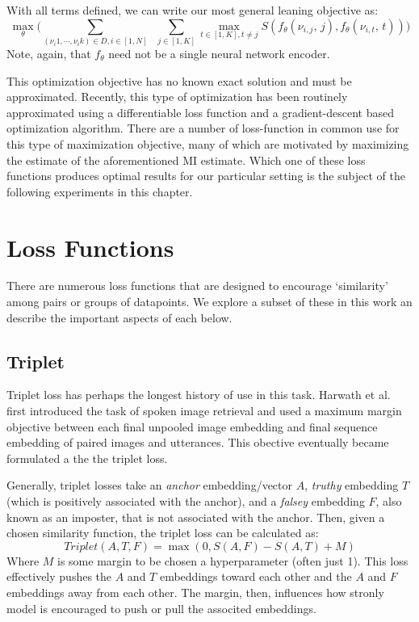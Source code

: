 With all terms defined, we can write our most general leaning objective as:
\begin{equation}
    \underset{\theta}{\max} \Big(\sum_{(\nu_i1,\cdots, \nu_ik)\in D, i\in[1,N]} \;\; \sum_{j\in[1,K]} \underset{t\in[1,K], t\neq j }{\max} S(f_\theta(\nu_{i,j}, \,j), f_\theta(\nu_{i,t}, \,t))\Big)
\end{equation}
Note, again, that $f_\theta$ need not be a single neural network encoder.

This optimization objective has no known exact solution  and must be approximated.
Recently, this type of optimization has been routinely  approximated using a differentiable loss function and a gradient-descent based optimization algorithm.
There are a number of loss-function in common use for this type of maximization objective, many of which are motivated by maximizing the estimate of the aforementioned MI estimate.
Which one of these loss functions produces optimal results for our particular setting is the subject of the following experiments in this chapter.

\section{Loss Functions}
There are numerous loss functions that are designed to encourage `similarity' among pairs or groups of datapoints.
We explore a subset of these in this work an describe the important aspects of each below.
\subsection{Triplet}
Triplet loss has perhaps the longest history of use in this task.
Harwath et al. \cite{harwath2015deep} first introduced the task of spoken image retrieval and used a maximum margin objective between each final unpooled image embedding and final sequence embedding of paired images and utterances.
This obective eventually became formulated a the the triplet loss.

Generally, triplet losses take an \textit{anchor} embedding/vector $A$, \textit{truthy} embedding $T$ (which is positively associated with the anchor), and a \textit{falsey} embedding $F$, also known as an imposter, that is not associated with the anchor. 
Then, given a chosen similarity function, the triplet loss can be calculated as:
\begin{equation}
\label{orig_triplet_loss}
    Triplet(A, T, F) = \max(0, S(A, F) - S(A, T) +M)
\end{equation}
Where $M$ is some margin to be chosen a hyperparameter (often just 1). 
This loss effectively pushes the $A$ and $T$ embeddings toward each other and the $A$ and $F$ embeddings away from each other.
The margin, then, influences how stronly model is encouraged to push or pull the associted embeddings.


